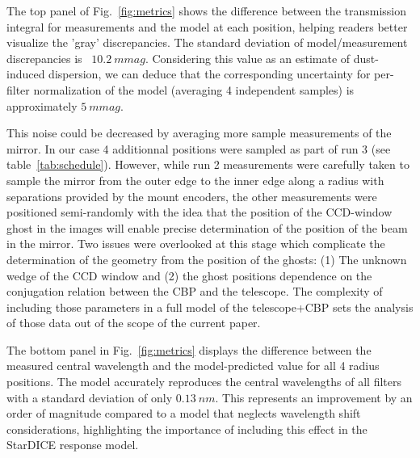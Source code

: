The top panel of Fig.~\ref{fig:metrics} shows the difference between
the transmission integral for measurements and the model at each
position, helping readers better visualize the 'gray'
discrepancies. The standard deviation of model/measurement
discrepancies is ~$\SI{10.2}{mmag}$. Considering this value as an
estimate of dust-induced dispersion, we can deduce that the
corresponding uncertainty for per-filter normalization of the model
(averaging 4 independent samples) is approximately $\SI{5}{mmag}$.

This noise could be decreased by averaging more sample measurements of
the mirror. In our case 4 additionnal positions were sampled as part
of run 3 (see table~\ref{tab:schedule}). However, while run 2
measurements were carefully taken to sample the mirror from the outer
edge to the inner edge along a radius with separations provided by the
mount encoders, the other measurements were positioned semi-randomly
with the idea that the position of the CCD-window ghost in the images
will enable precise determination of the position of the beam in the
mirror. Two issues were overlooked at this stage which complicate the
determination of the geometry from the position of the ghosts: (1) The
unknown wedge of the CCD window and (2) the ghost positions dependence on the
conjugation relation between the CBP and the telescope. The complexity of 
including those parameters in a full model of the telescope+CBP sets the
analysis of those data out of the scope of the current paper. 

The bottom panel in Fig.~\ref{fig:metrics} displays the difference
between the measured central wavelength and the model-predicted value
for all 4 radius positions. The model accurately reproduces the
central wavelengths of all filters with a standard deviation of only
$\SI{0.13}{nm}$. This represents an improvement by an order of
magnitude compared to a model that neglects wavelength shift
considerations, highlighting the importance of including this effect
in the StarDICE response model.

